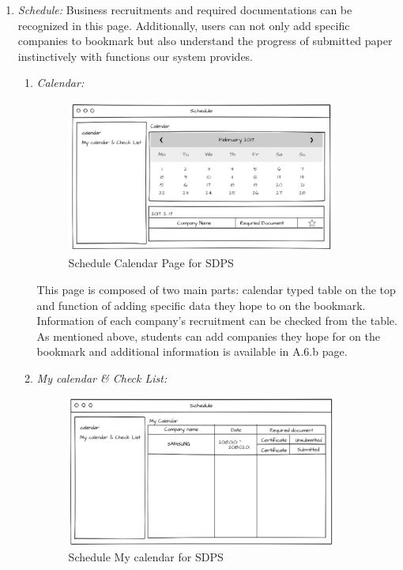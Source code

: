 \documentclass[conference]{IEEEtran}
\begin{document}
\begin{enumerate}
       \item \textit {Schedule: }Business recruitments and required documentations can be recognized in this page. Additionally, users can not only add specific companies to bookmark but also understand the progress of submitted paper instinctively with functions our system provides.\\
    \begin{enumerate}
    	\item  \textit{Calendar:} 
	\begin{figure}[htbp]
	\centerline{\includegraphics[width=89mm,scale=0.5]{student/calendar.png}}
	\caption{Schedule Calendar Page for SDPS}
	\label{fig}
	\end{figure} 
	
	This page is composed of two main parts: calendar typed table on the top and function of adding specific data they hope to on the bookmark. Information of each company’s recruitment can be checked from the table. As mentioned above, students can add companies they hope for on the bookmark and additional information is available in A.6.b page.\\
	\vspace{10mm}
	
        \item \textit{My calendar \& Check List:} 
        \begin{figure}[htbp]
	\centerline{\includegraphics[width=89mm,scale=0.5]{student/My_calendar.png}}
	\caption{Schedule My calendar for SDPS}
	\label{fig}
	\end{figure} 
        

\end{enumerate}
\end{enumerate}
\end{document}
